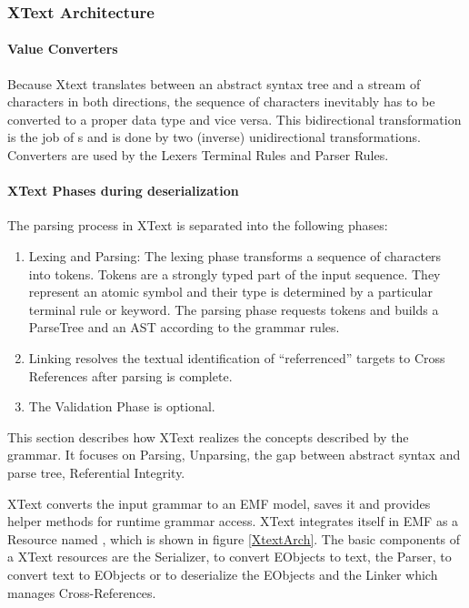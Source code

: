 \subsubsection{XText Architecture} \label{cha:xtextarch}

\paragraph{Value Converters}
Because Xtext translates between an abstract syntax tree and a stream of characters in both directions, the sequence of characters inevitably has to be converted to a proper data type and vice versa. This bidirectional transformation is the job of s and is done by two (inverse) unidirectional transformations. Converters are used by the Lexers Terminal Rules and Parser Rules.


\paragraph{XText Phases during deserialization}
The parsing process in XText is separated into the following phases:
\begin{enumerate}
	\item Lexing and Parsing: The lexing phase transforms a sequence of characters into tokens. Tokens are a strongly typed part of the input sequence. They represent an atomic symbol and their type is determined by a particular terminal rule or keyword. The parsing phase requests tokens and builds a ParseTree and an AST according to the grammar rules.
	\item Linking resolves the textual identification of ``referrenced'' targets to Cross References after parsing is complete.
	\item The Validation Phase is optional.
\end{enumerate}

This section describes how XText realizes the  concepts described by the grammar. It focuses on Parsing, Unparsing, the gap between abstract syntax and parse tree, Referential Integrity. 

XText converts the input grammar to an EMF model, saves it and provides helper methods for runtime grammar access. XText integrates itself in EMF as a Resource named , which is shown in figure \ref{XtextArch}.  The basic components of a XText resources are the Serializer, to convert EObjects to text, the Parser, to convert text to EObjects or to deserialize the EObjects and the Linker which manages Cross-References. 

